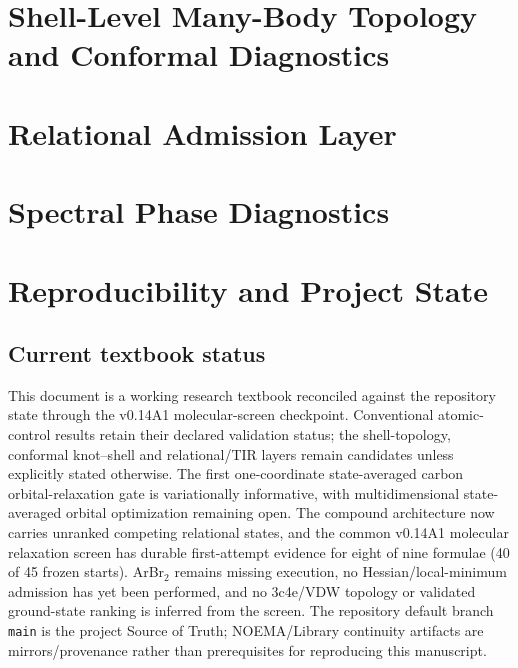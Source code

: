 \documentclass[11pt,a4paper,oneside]{book}
\begin{document}
\part{Shell-Level Many-Body Topology and Conformal Diagnostics}




\part{Relational Admission Layer}


\part{Spectral Phase Diagnostics}


\appendix
\part{Reproducibility and Project State}





\backmatter

\nocite{*}



\chapter*{Current textbook status}
This document is a working research textbook reconciled against the repository state through the v0.14A1 molecular-screen checkpoint.  Conventional atomic-control results retain their declared validation status; the shell-topology, conformal knot--shell and relational/TIR layers remain candidates unless explicitly stated otherwise.  The first one-coordinate state-averaged carbon orbital-relaxation gate is variationally informative, with multidimensional state-averaged orbital optimization remaining open.  The compound architecture now carries unranked competing relational states, and the common v0.14A1 molecular relaxation screen has durable first-attempt evidence for eight of nine formulae (40 of 45 frozen starts).  ArBr$_2$ remains missing execution, no Hessian/local-minimum admission has yet been performed, and no 3c4e/VDW topology or validated ground-state ranking is inferred from the screen.  The repository default branch \texttt{main} is the project Source of Truth; NOEMA/Library continuity artifacts are mirrors/provenance rather than prerequisites for reproducing this manuscript.
\end{document}
